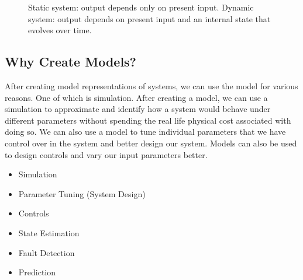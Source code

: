 \documentclass[11pt]{article}
\begin{document}
\begin{figure}[h]
\centering
{}
\caption{Static system: output depends only on present input. Dynamic system: output depends on present input and an internal state that evolves over time.}
\end{figure}

\subsection{Why Create Models?}
After creating model representations of systems, we can use the model for various reasons.
One of which is simulation. 
After creating a model, we can use a simulation to approximate and identify how a system would behave under different parameters without spending the real life physical cost associated with doing so.
We can also use a model to tune individual parameters that we have control over in the system and better design our system.
Models can also be used to design controls and vary our input parameters better.
\begin{itemize}
    \item Simulation
    \item Parameter Tuning (System Design)
    \item Controls
    \item State Estimation
    \item Fault Detection
    \item Prediction
\end{itemize}
\end{document}
